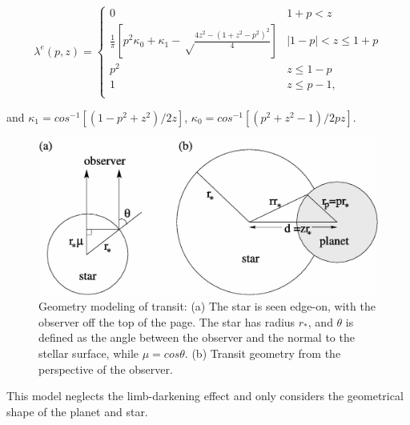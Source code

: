 \documentclass{article}
\begin{document}
\begin{equation}
\label{uniformoccult}
\lambda^e(p,z) = 
\left\{\begin{array}{ll}
0  &  1+p < z \\\frac{1}{\pi} \left[p^2 \kappa_0+\kappa_1-\sqrt\frac{4z^2-(1+z^2-p^2)^2} {4}\right] &  |1-p| < z \le 1+p \\
 p^2 & z \le 1-p\\
1  &  z \le p-1,\\
\end{array}\right.
\end{equation}

and $\kappa_{1} = cos^{-1}[(1-p^2+z^2)/2z]$, $\kappa_{0} = cos^{-1}[(p^2+z^2-1)/2pz]$. 
\vspace{\baselineskip}

\begin{figure}[H]
    \centering
    \includegraphics[width=0.9\linewidth]{image/sample_eclipse_model.png}
    \captionsetup{font=small} 
    \caption{Geometry modeling of transit: (a) The star is seen edge-on, with the observer off the top of the page. The star has radius $r_*$, and $\theta$ is defined as the angle between the observer and the normal to the stellar surface, while $\mu = cos\theta$. (b) Transit geometry from the perspective of the observer.}
    \label{fig:sem_alc}
\end{figure}
\vspace{\baselineskip}
This model neglects the limb-darkening effect and only considers the geometrical shape of the planet and star.
\end{document}

